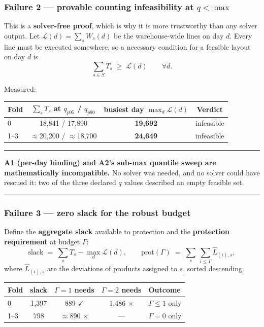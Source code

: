 \documentclass[11pt,a4paper]{article}
\newenvironment{keybox}
  {\par\medskip\noindent\rule{\linewidth}{0.9pt}\par\nobreak\smallskip\ignorespaces}
  {\par\smallskip\nobreak\noindent\rule{\linewidth}{0.9pt}\par\medskip}
\newcommand{\yes}{\ensuremath{\checkmark}}
\newcommand{\no}{\ensuremath{\times}}
\begin{document}
\subsubsection*{Failure 2 --- provable counting infeasibility at $q<\max$}

This is a \textbf{solver-free proof}, which is why it is more trustworthy than
any solver output. Let $\mathcal{L}(d)=\sum_s W_s(d)$ be the warehouse-wide
lines on day $d$. Every line must be executed somewhere, so a necessary
condition for a feasible layout on day $d$ is
\begin{equation}
  \sum_{s\in S} T_s \;\ge\; \mathcal{L}(d) \qquad \forall d .
  \label{eq:counting}
\end{equation}

Measured:

\begin{center}
\begin{tabular}{lccc}
\toprule
Fold & $\sum_s T_s$ at $q_{p95}$ / $q_{p90}$ & busiest day $\max_d \mathcal{L}(d)$ & Verdict \\
\midrule
0     & 18{,}841 / 17{,}890 & \textbf{19{,}692} & infeasible \\
1--3  & $\approx$20{,}200 / $\approx$18{,}700 & \textbf{24{,}649} & infeasible \\
\bottomrule
\end{tabular}
\end{center}

\begin{keybox}
\textbf{A1 (per-day binding) and A2's sub-max quantile sweep are
mathematically incompatible.} No solver was needed, and no solver could have
rescued it: two of the three declared $q$ values described an empty feasible
set.
\end{keybox}

\subsubsection*{Failure 3 --- zero slack for the robust budget}

Define the \textbf{aggregate slack} available to protection and the
\textbf{protection requirement} at budget $\Gamma$:
\[
  \text{slack} \;=\; \sum_s T_s - \max_d \mathcal{L}(d),
  \qquad
  \text{prot}(\Gamma) \;=\; \sum_s \ \sum_{i\le\Gamma} \hat L_{(i),s},
\]
where $\hat L_{(i),s}$ are the deviations of products assigned to $s$, sorted
descending.

\begin{center}
\begin{tabular}{lcccl}
\toprule
Fold & slack & $\Gamma=1$ needs & $\Gamma=2$ needs & Outcome \\
\midrule
0    & 1{,}397 & 889 \yes & 1{,}486 \no & $\Gamma\le1$ only \\
1--3 & 798     & $\approx$890 \no & --- & $\Gamma=0$ only \\
\bottomrule
\end{tabular}
\end{center}
\end{document}
